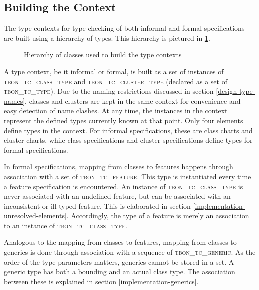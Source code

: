 \subsection{Building the Context}
\label{implementation-context-class-structure}
The type contexts for type checking of both informal and formal specifications are built using a hierarchy of types. This hierarchy is pictured in \ref{fig:context-classes}.
\begin{figure}[H]
    \centerline{}
    \caption[Context classes]{Hierarchy of classes used to build the type contexts}
    \label{fig:context-classes}
\end{figure}
A type context, be it informal or formal, is built as a set of instances of \textsc{tbon\_tc\_class\_type}  and \textsc{tbon\_tc\_cluster\_type}  (declared as a set of \textsc{tbon\_tc\_type}). Due to the naming restrictions discussed in section \ref{design-type-names}, classes and clusters are kept in the same context for convenience and easy detection of name clashes. At any time, the instances in the context represent the defined types currently known at that point. Only four \bon{} elements define types in the context. For informal specifications, these are class charts and cluster charts, while class specifications and cluster specifications define types for formal specifications.

In formal specifications, mapping from classes to features happens through association with a set of \textsc{tbon\_tc\_feature}. This type is instantiated every time a feature specification is encountered. An instance of \textsc{tbon\_tc\_class\_type} is never associated with an undefined feature, but can be associated with an inconsistent or ill-typed feature. This is elaborated in section \ref{implementation-unresolved-elements}. Accordingly, the type of a feature is merely an association to an instance of \textsc{tbon\_tc\_class\_type}.

Analogous to the mapping from classes to features, mapping from classes to generics is done through association with a sequence of \textsc{tbon\_tc\_generic}. As the order of the type parameters matters, generics cannot be stored in a set. A generic type has both a bounding and an actual class type. The association between these is explained in section \ref{implementation-generics}.

